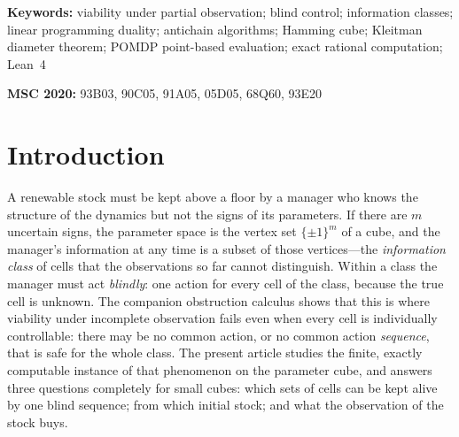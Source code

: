 \documentclass[11pt,a4paper]{article}
\theoremstyle{plain}
\theoremstyle{definition}
\theoremstyle{remark}
\begin{document}
\begin{abstract}
survival until the horizon exceeds $L$. The $143{,}360$ boundary sets at $m=6$ explain why exact arithmetic is necessary: a floating-point simulation of their optimal words declares a false collapse in $1{,}120$ of the $1{,}280$ maximal cases, depending only on how the same rational drift is coded. Every number is regenerated by an exact script; the dynamics, pair laws, the $m=4$ classification and the deadline law are machine-checked in Lean~4 ($80$ theorems, no \texttt{sorry}).
\end{abstract}

\medskip
\noindent\textbf{Keywords:} viability under partial observation; blind control; information classes; linear programming duality; antichain algorithms; Hamming cube; Kleitman diameter theorem; POMDP point-based evaluation; exact rational computation; Lean~4

\medskip
\noindent\textbf{MSC 2020:} 93B03, 90C05, 91A05, 05D05, 68Q60, 93E20
\section{Introduction}\label{sec:intro}

A renewable stock must be kept above a floor by a manager who knows the structure of the dynamics but not the signs of its parameters. If there are $m$ uncertain signs, the parameter space is the vertex set $\{\pm1\}^m$ of a cube, and the manager's information at any time is a subset of those vertices---the \emph{information class} of cells that the observations so far cannot distinguish. Within a class the manager must act \emph{blindly}: one action for every cell of the class, because the true cell is unknown. The companion obstruction calculus \cite{Abaee2026calc} shows that this is where viability under incomplete observation fails even when every cell is individually controllable: there may be no common action, or no common action \emph{sequence}, that is safe for the whole class. The present article studies the finite, exactly computable instance of that phenomenon on the parameter cube, and answers three questions completely for small cubes: which sets of cells can be kept alive by one blind sequence; from which initial stock; and what the observation of the stock buys.
\end{document}
